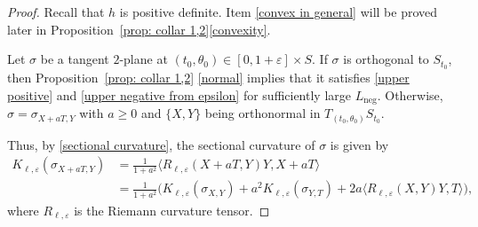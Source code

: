 \documentclass[JEP,XML,SOM,Unicode,NoFloatCountersInSection]{cedram}
\newcommand{\Neg}{\mathrm{neg}}
\theoremstyle{definition}
\let\eps\varepsilon
\renewcommand{\>}{{\rangle}}
\newcommand{\<}{{\langle}}
\begin{document}
\begin{proof}
Recall that $h$ is positive definite.
Item \eqref{convex in general} will be proved later in Proposition~\ref{prop: collar 1,2}\eqref{convexity}.

Let $\sigma$ be a tangent $2$-plane at $(t_0,\theta_0)\in[0,1+\eps]\times S$. If $\sigma$ is orthogonal to $S_{t_0}$, then Proposition~\ref{prop: collar 1,2} \eqref{normal} implies that it satisfies \ref{upper positive} and \ref{upper negative from epsilon} for sufficiently large $L_{\Neg}$. Otherwise, $\sigma=\sigma_{X+aT,Y}$ with $a\geq 0$ and $\{X,Y\}$ being orthonormal in $T_{(t_0,\theta_0)}S_{t_0}$.

Thus, by \eqref{sectional curvature}, the sectional curvature of $\sigma$ is given by
\begin{equation}\label{sectional mixed expression}
\begin{aligned}
K_{\ell,\eps}(\sigma_{X+aT,Y}) &= \frac{1}{1+a^2}\langle R_{\ell,\eps}(X+aT,Y)Y,X+aT\rangle\\
&= \frac{1}{1+a^2}\bigl(K_{\ell,\eps}(\sigma_{X,Y})+a^2K_{\ell,\eps}(\sigma_{Y,T})+2a\langle R_{\ell,\eps}(X,Y)Y,T\rangle \bigr),
\end{aligned}
\end{equation}
where $R_{\ell,\eps}$ is the Riemann curvature tensor.


\end{proof}
\end{document}
